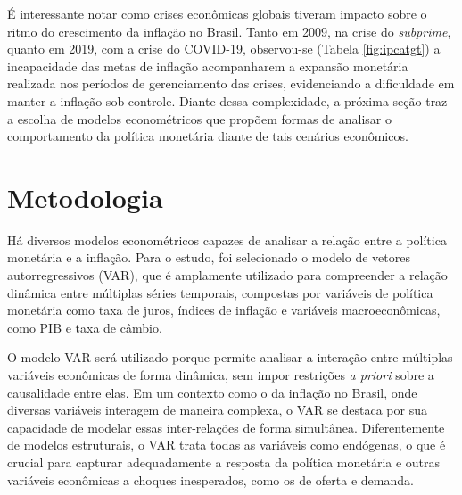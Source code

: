 \documentclass[12pt,oneside,a4paper,chapter=TITLE,english,brazil,sumario=abnt-6027-2012]{abntex2}
\begin{document}
É interessante notar como crises econômicas	globais tiveram impacto sobre o ritmo do crescimento da inflação no Brasil. Tanto em 2009, na crise do \textit{subprime}, quanto em 2019, com a crise do COVID-19, observou-se (Tabela \ref{fig:ipcatgt}) a incapacidade das metas de inflação acompanharem a expansão monetária realizada nos períodos de gerenciamento das crises, evidenciando a dificuldade em manter a inflação sob controle. Diante dessa complexidade, a próxima seção traz a escolha de modelos econométricos que propõem formas de analisar o comportamento da política monetária diante de tais cenários econômicos.





\chapter{Metodologia}

Há diversos modelos econométricos capazes de analisar a relação entre a política monetária e a inflação. Para o estudo, foi selecionado o modelo de vetores autorregressivos (VAR), que é amplamente utilizado para compreender a relação dinâmica entre múltiplas séries temporais, compostas por variáveis de política monetária como taxa de juros, índices de inflação e variáveis macroeconômicas, como PIB e taxa de câmbio. 

O modelo VAR será utilizado porque permite analisar a interação entre múltiplas variáveis econômicas de forma dinâmica, sem impor restrições \textit{a priori} sobre a causalidade entre elas. Em um contexto como o da inflação no Brasil, onde diversas variáveis interagem de maneira complexa, o VAR se destaca por sua capacidade de modelar essas inter-relações de forma simultânea. Diferentemente de modelos estruturais, o VAR trata todas as variáveis como endógenas, o que é crucial para capturar adequadamente a resposta da política monetária e outras variáveis econômicas a choques inesperados, como os de oferta e demanda.
\end{document}
